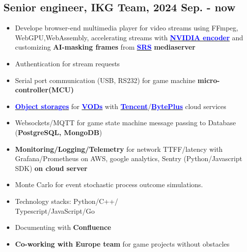 \documentclass[11pt]{article}
\begin{document}
\begin{multicols*}{2}
\subsection*{Senior engineer, IKG Team, 2024 Sep. - now}
\begin{itemize}[noitemsep]
    \item Develope browser-end multimedia player for video streams using FFmpeg, WebGPU,WebAssembly, 
    accelerating streams with \href{https://developer.nvidia.com/video-codec-sdk}{\textbf{\textcolor{blue}{NVIDIA encoder}}} 
    and customizing\textbf{ AI-masking frames} from \href{https://github.com/ossrs/srs}{\textbf{\textcolor{blue}{SRS}}} \textbf{ mediaserver} 
    \item Authentication for stream requests
    \item Serial port communication (USB, RS232) for game machine \textbf{micro-controller(MCU)}
    \item \href{https://www.byteplus.com/en/product/tos}{\textbf{\textcolor{blue}{Object storages}}} for \href{https://www.byteplus.com/en/product/vod}{\textbf{\textcolor{blue}{VODs}}} with \href{https://www.tencent.com/en-us/cloud}{\textbf{\textcolor{blue}{Tencent}}}/\href{https://www.byteplus.com/en/product/vod}{\textbf{\textcolor{blue}{BytePlus}}} cloud services
    \item Websockets/MQTT for game state machine message passing to Database (\textbf{PostgreSQL, MongoDB})
    \item \textbf{Monitoring/Logging/Telemetry} for network TTFF/latency with Grafana/Prometheus on AWS, 
    google analytics, Sentry (Python/Javascript SDK) \textbf{on cloud server}
    \item Monte Carlo for event stochastic process outcome simulations.
    \item Technology stacks: Python/C++/\\Typescript/JavaScript/Go 
    \item Documenting with \textbf{Confluence}
    \item \textbf{Co-working with Europe team} for game projects without obstacles
\end{itemize}

\vspace{0.8em}


\end{multicols*}
\end{document}
